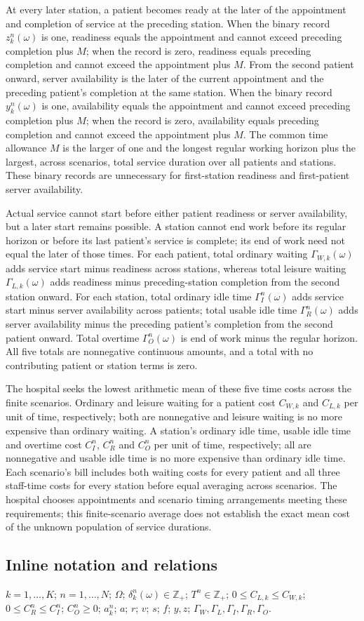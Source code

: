 \documentclass[10pt]{article}
\begin{document}
At every later station, a patient becomes ready at the later of the appointment and completion of service at the preceding station. When the binary record $z_k^n(\omega)$ is one, readiness equals the appointment and cannot exceed preceding completion plus $M$; when the record is zero, readiness equals preceding completion and cannot exceed the appointment plus $M$. From the second patient onward, server availability is the later of the current appointment and the preceding patient's completion at the same station. When the binary record $y_k^n(\omega)$ is one, availability equals the appointment and cannot exceed preceding completion plus $M$; when the record is zero, availability equals preceding completion and cannot exceed the appointment plus $M$. The common time allowance $M$ is the larger of one and the longest regular working horizon plus the largest, across scenarios, total service duration over all patients and stations. These binary records are unnecessary for first-station readiness and first-patient server availability.

Actual service cannot start before either patient readiness or server availability, but a later start remains possible. A station cannot end work before its regular horizon or before its last patient's service is complete; its end of work need not equal the later of those times. For each patient, total ordinary waiting $\Gamma_{W,k}(\omega)$ adds service start minus readiness across stations, whereas total leisure waiting $\Gamma_{L,k}(\omega)$ adds readiness minus preceding-station completion from the second station onward. For each station, total ordinary idle time $\Gamma_I^n(\omega)$ adds service start minus server availability across patients; total usable idle time $\Gamma_R^n(\omega)$ adds server availability minus the preceding patient's completion from the second patient onward. Total overtime $\Gamma_O^n(\omega)$ is end of work minus the regular horizon. All five totals are nonnegative continuous amounts, and a total with no contributing patient or station terms is zero.

The hospital seeks the lowest arithmetic mean of these five time costs across the finite scenarios. Ordinary and leisure waiting for a patient cost $C_{W,k}$ and $C_{L,k}$ per unit of time, respectively; both are nonnegative and leisure waiting is no more expensive than ordinary waiting. A station's ordinary idle time, usable idle time and overtime cost $C_I^n$, $C_R^n$ and $C_O^n$ per unit of time, respectively; all are nonnegative and usable idle time is no more expensive than ordinary idle time. Each scenario's bill includes both waiting costs for every patient and all three staff-time costs for every station before equal averaging across scenarios. The hospital chooses appointments and scenario timing arrangements meeting these requirements; this finite-scenario average does not establish the exact mean cost of the unknown population of service durations.

\subsection*{Inline notation and relations}
$k=1,\ldots,K$; $n=1,\ldots,N$; $\Omega$; $\delta_k^n(\omega)\in\mathbb Z_+$; $T^n\in\mathbb Z_+$; $0\leq C_{L,k}\leq C_{W,k}$; $0\leq C_R^n\leq C_I^n$; $C_O^n\geq0$; $a_k^n$; $a$; $r$; $v$; $s$; $f$; $y,z$; $\Gamma_W,\Gamma_L,\Gamma_I,\Gamma_R,\Gamma_O$.
\end{document}
